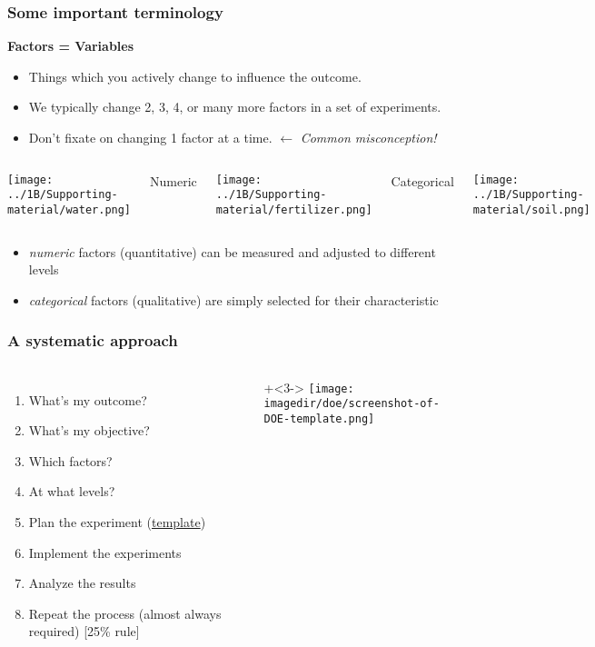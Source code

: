\documentclass[handout,11pt,aspectratio=169,mathserif]{beamer}
\begin{document}
\begin{frame}\frametitle{Some important terminology}
	\vspace{12pt}
	\textbf{{\color{purple} Factors = Variables}}
		\begin{itemize}
			\item	Things which you actively change to influence the outcome.
			\item	We typically change 2, 3, 4, or many more factors in a set of experiments. \pause
			\item	Don't fixate on changing 1 factor at a time. {\color{myOrange}  $\longleftarrow$	\emph{Common misconception!}}
		\end{itemize}
	
	\begin{columns}[T]
			\centerline{\texttt{[image: ../1B/Supporting-material/water.png]}}
			
			\centerline{Numeric}


			\centerline{\texttt{[image: ../1B/Supporting-material/fertilizer.png]}}
			
			\centerline{Categorical}


			\centerline{\texttt{[image: ../1B/Supporting-material/soil.png]}}
	\end{columns}
	
	\begin{itemize}
		\item	\emph{numeric} factors (quantitative) can be measured and adjusted to different levels
		\item	\emph{categorical} factors (qualitative) are simply selected for their characteristic
	\end{itemize}	
\end{frame}
\begin{frame}\frametitle{A systematic approach} 
	\begin{columns}[T]
			\Large
			\begin{enumerate}
			\item	What's my outcome? 
			\item	What's my objective? \pause
			\item	Which factors? 
			\item	At what levels?\pause
			\item	Plan the experiment {\small (\href{https://yint.org/template}{template})}\pause
			\item	Implement the experiments \pause
			\item	Analyze the results\pause
			\item	Repeat the process \newline (almost always required) [25\% rule]
			\end{enumerate}
			
			\onslide+<3->{
				\texttt{[image: \\imagedir/doe/screenshot-of-DOE-template.png]}
			}
	\end{columns}
\end{frame}
\end{document}
